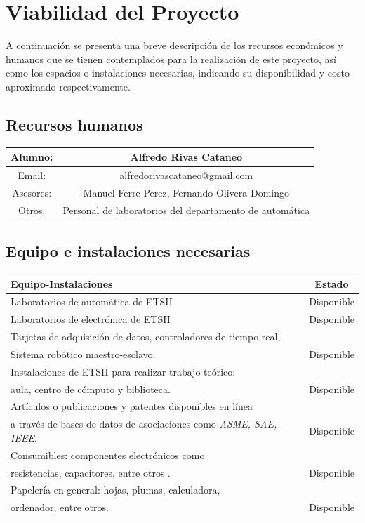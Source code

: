 \section{Viabilidad del Proyecto}
A continuación se presenta una breve descripción de los recursos  económicos y humanos que se tienen contemplados para la realización de este proyecto, así como los espacios o instalaciones necesarias, indicando su disponibilidad y costo aproximado respectivamente. 
\subsection{Recursos humanos}

\begin{flushleft}


\begin{tabular}{|c|c|}

\hline 
Alumno: & Alfredo Rivas Cataneo \\ 
\hline 
Email: & alfredorivascataneo@gmail.com \\ 
\hline 
Asesores:& Manuel Ferre Perez, Fernando Olivera Domingo\\ 
\hline 
Otros: & Personal de laboratorios del departamento de automática \\ 
\hline 
\end{tabular} 
  
\end{flushleft}  
  
\subsection{Equipo e instalaciones necesarias}
\begin{flushleft}
\begin{tabular}{l c}
\hline
\hline
Equipo-Instalaciones & Estado\\
\hline
Laboratorios de automática de ETSII & Disponible \\
\hline
  Laboratorios de electrónica de ETSII  & Disponible\\
  \hline
Tarjetas de adquisición de datos, controladores de tiempo real,\\ Sistema robótico maestro-esclavo.  & Disponible\\
  \hline
  Instalaciones de ETSII para realizar trabajo teórico:\\ aula, centro de cómputo y biblioteca.  & Disponible\\
  \hline
  Artículos o publicaciones y patentes disponibles en línea\\ a través de bases de datos de asociaciones como \textsl{ASME, SAE, IEEE}.  & Disponible\\
  \hline
  Consumibles:  componentes electrónicos como\\ resistencias, capacitores, entre otros .  & Disponible\\
  \hline
  Papelería en general: hojas, plumas, calculadora,\\ ordenador, entre otros.& Disponible\\
  \hline
  \hline


\end{tabular}
\end{flushleft}
  

